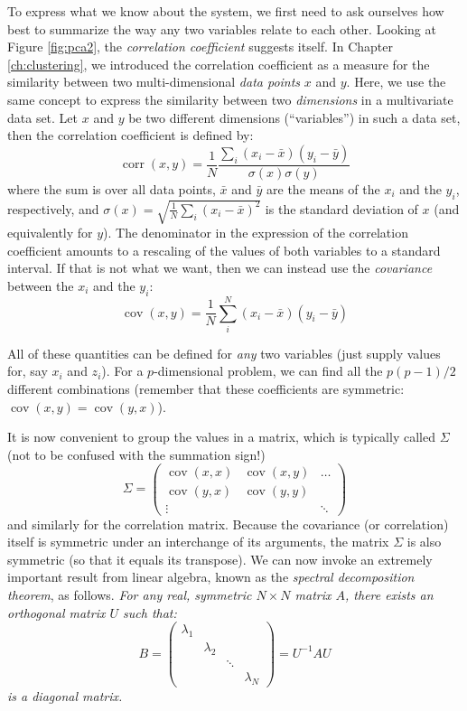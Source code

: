 To express what we know about the system, we first need to ask
ourselves how best to summarize the way any two variables relate to
each other. Looking at Figure \ref{fig:pca2}, the \emph{correlation
  coefficient}  suggests itself.  In Chapter \ref{ch:clustering}, we
introduced the correlation coefficient as a measure for the similarity
between two multi-dimensional \emph{data points} $x$ and $y$. Here, we
use the same concept to express the similarity between two
\emph{dimensions} in a multivariate data set. Let $x$ and $y$ be two
different dimensions (``variables'') in such a data set, then the
correlation coefficient is defined by:
%
\[ 
\operatorname{corr}(x,y) 
  = \frac{1}{N}
    \frac{ \sum_i ( x_i - \bar{x} ) ( y_i - \bar{y} ) } 
         { \sigma(x) \sigma(y) }
\]
%
where the sum is over all data points, $\bar{x}$ and $\bar{y}$ are the
means of the $x_i$ and the $y_i$, respectively, and $\sigma(x) = \sqrt{
  \frac{1}{N} \sum_i (x_i - \bar{x})^2 }$ is the standard deviation of
$x$ (and equivalently for $y$). The denominator in the expression of
the correlation coefficient amounts to a rescaling of the values of
both variables to a standard interval. If that is not what we want,
then we can instead use the \emph{covariance} between the $x_i$ and
the $y_i$:
%
\[ 
\operatorname{cov}(x,y)
   = \frac{1}{N} \sum_i^N ( x_i - \bar{x} ) ( y_i - \bar{y} ) 
\]
%

All of these quantities can be defined for \emph{any} two variables
(just supply values for, say $x_i$ and $z_i$). For a $p$-dimensional
problem, we can find all the $p(p-1)/2$ different combinations
(remember that these coefficients are symmetric:
$\operatorname{cov}(x,y) = \operatorname{cov}(y,x)$).

It is now convenient to group the values in a matrix, which is
typically called $\Sigma$ (not to be confused with the summation
sign!)
%
\[
\Sigma = 
\begin{pmatrix}
\operatorname{cov}(x,x) & \operatorname{cov}(x,y) & \dots \\
\operatorname{cov}(y,x) & \operatorname{cov}(y,y) & \\
\vdots &  & \ddots 
\end{pmatrix}
\]
%
and similarly for the correlation matrix. Because the covariance (or
correlation) itself is symmetric under an interchange of its
arguments, the matrix $\Sigma$ is also symmetric (so that it equals
its transpose).
We can now invoke an extremely important result from linear algebra,
known as the \emph{spectral decomposition theorem},  as follows.
\emph{
For any real, symmetric $N \times N$ matrix $A$, there exists an 
orthogonal matrix $U$ such that:
%
\[
B =
\begin{pmatrix}
\lambda_1 &           &        &           \\
          & \lambda_2 &        &           \\
          &           & \ddots &           \\
          &           &        & \lambda_N
\end{pmatrix}
= U^{-1} A U
\]
is a diagonal matrix.} 

